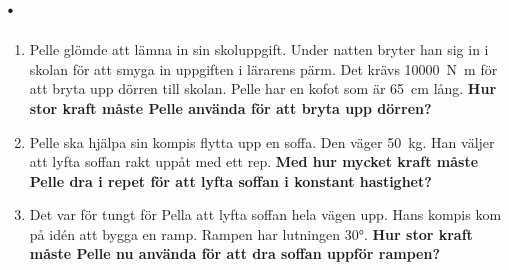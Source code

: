 \documentclass[11pt]{article}
\begin{document}
\raggedright

\section*{\lessonNumber. \lessonName}
\begin{enumerate}[itemsep=2em]
        \item
              \begin{minipage}[t]{0.5\textwidth}
                      Pelle glömde att lämna in sin skoluppgift.
                      Under natten bryter han sig in i skolan för att smyga in uppgiften i lärarens pärm. Det krävs \SI{10 000}{\newton\meter} för att bryta upp dörren till skolan. Pelle har en kofot som är \SI{65}{\centi\meter} lång. \textbf{Hur stor kraft måste Pelle använda för att bryta upp dörren?}
              \end{minipage}
              \hspace{1em}
              \begin{adjustbox}{valign=t}
                      
              \end{adjustbox}
        \item
              \begin{minipage}[t]{0.5\textwidth}
                      Pelle ska hjälpa sin kompis flytta upp en soffa. Den väger \SI{50}{\kilo\gram}. Han väljer att lyfta soffan rakt uppåt med ett rep. \textbf{Med hur mycket kraft måste Pelle dra i repet för att lyfta soffan i konstant hastighet?}
              \end{minipage}
              \hspace{1em}
              \begin{adjustbox}{valign=t}
                      
              \end{adjustbox}

        \item
              Det var för tungt för Pella att lyfta soffan hela vägen upp. Hans kompis kom på idén att bygga en ramp. Rampen har lutningen \ang{30}. \textbf{Hur stor kraft måste Pelle nu använda för att dra soffan uppför rampen?}
              \begin{center}
                            
                  \end{center}

\end{enumerate}
\end{document}
